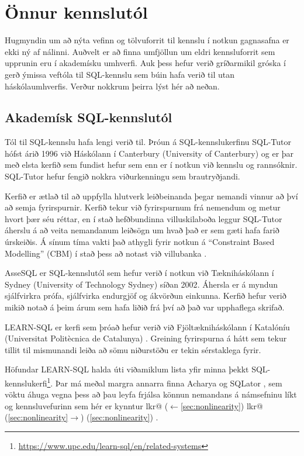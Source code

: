 \documentclass[a4paper,12pt,twoside,BCOR=10mm]{scrbook}
\makeatletter
\newcounter{labelknownref}
\renewcommand*{\thelabelknownref}{\the\value{labelknownref}}
\newcommand*{\LabelKnown}[2]{%
  \expandafter\xdef\csname lkr@#2\endcsname{%
    \@ifundefined{r@#1}{0}{1}%
  }%
}
\newcommand*{\myref}[1]{%
  \begingroup
    \stepcounter{labelknownref}%
    \if@filesw
      \protected@write\@auxout{}{%
        \string\LabelKnown{#1}{\thelabelknownref}%
      }%
    \fi 
    \if\csname lkr@\thelabelknownref\endcsname 1%
      ($\leftarrow$\ref{#1})%
    \else
      \if\csname lkr@\thelabelknownref\endcsname 0%
        (\ref{#1}$\rightarrow$)%
      \else
        (\ref{#1})%
      \fi
    \fi
  \endgroup
}
\makeatother
\begin{document}
\section{Önnur kennslutól}
Hugmyndin um að nýta vefinn og tölvuforrit til kennslu í notkun gagnasafna er ekki ný af nálinni. Auðvelt er að finna umfjöllun um eldri kennsluforrit sem upprunin eru í akademísku umhverfi. Auk þess hefur verið gríðarmikil gróska í gerð ýmissa veftóla til SQL-kennslu sem búin hafa verið til utan háskólaumhverfis. Verður nokkrum þeirra lýst hér að neðan.

\subsection{Akademísk SQL-kennslutól}
Tól til SQL-kennslu hafa lengi verið til. Þróun á SQL-kennslukerfinu SQL-Tutor hófst árið 1996 við Háskólann í Canterbury (University of Canterbury) og er þar með elsta kerfið sem fundist hefur sem enn er í notkun við kennslu og rannsóknir. SQL-Tutor hefur fengið nokkra viðurkenningu sem brautryðjandi.

Kerfið er ætlað til að uppfylla hlutverk leiðbeinanda þegar nemandi vinnur að því að semja fyrirspurnir. Kerfið tekur við fyrirspurnum frá nemendum og metur hvort þær séu réttar, en í stað hefðbundinna villuskilaboða leggur SQL-Tutor áherslu á að veita nemandanum leiðsögn um hvað það er sem gæti hafa farið úrskeiðis. Á sínum tíma vakti það athygli fyrir notkun á ``Constraint Based Modelling'' (CBM) í stað þess að notast við villubanka \cite{mitrovic1998,mitrovic2016implementing}.

AsseSQL er SQL-kennslutól sem hefur verið í notkun við Tækniháskólann í Sydney (University of Technology Sydney) síðan 2002\cite{prior2003online,prior2014assesql}. Áhersla er á myndun sjálfvirkra prófa, sjálfvirka endurgjöf og ákvörðun einkunna. Kerfið hefur verið mikið notað á þeim árum sem hafa liðið frá því að það var upphaflega skrifað.

LEARN-SQL er kerfi sem þróað hefur verið við Fjöltækniháskólann í Katalóníu (Universitat Politècnica de Catalunya) \cite{abello2008learn}. Greining fyrirspurna á hátt sem tekur tillit til mismunandi leiða að sömu niðurstöðu er tekin sérstaklega fyrir.

Höfundar LEARN-SQL halda úti viðamiklum lista yfir minna þekkt SQL-kennslukerfi\footnote{\url{https://www.upc.edu/learn-sql/en/related-systems}}. Þar má meðal margra annarra finna Acharya\cite{bhagat2002} og SQLator \cite{sadiq2004sqlator}, sem vöktu áhuga vegna þess að þau leyfa frjálsa könnun nemandans á námsefninu líkt og kennsluvefurinn sem hér er kynntur\myref{sec:nonlinearity}.
\end{document}
